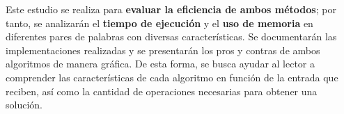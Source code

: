 Este estudio se realiza para \textbf{evaluar la eficiencia de ambos métodos}; por tanto, se analizarán el \textbf{tiempo de ejecución} y el \textbf{uso de memoria} en diferentes pares de palabras con diversas características. Se documentarán las implementaciones realizadas y se presentarán los pros y contras de ambos algoritmos de manera gráfica. De esta forma, se busca ayudar al lector a comprender las características de cada algoritmo en función de la entrada que reciben, así como la cantidad de operaciones necesarias para obtener una solución.



